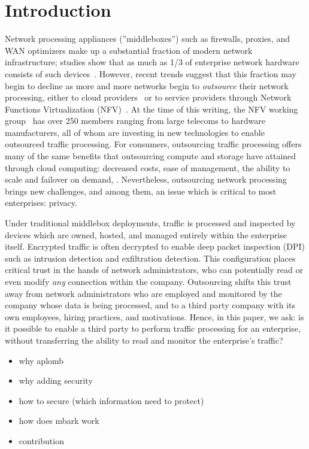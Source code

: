 
\section{Introduction}\label{sec:intro}

    Network processing appliances (''middleboxes'') such as firewalls, proxies, and WAN optimizers make up a substantial fraction of modern network infrastructure; studies show that as much as 1/3 of enterprise network hardware consists of such devices~\cite{aplomb}.
    However, recent trends suggest that this fraction may begin to decline as more and more networks begin to {\it outsource} their network processing, either to cloud providers~\cite{aplomb, aryaka, zscalar} or to service providers through Network Functions Virtualization (NFV)~\cite{nfv}.
    At the time of this writing, the NFV working group~\cite{nfvwg} has over 250 members ranging from large telecoms to hardware manufacturers, all of whom are investing in new technologies to enable outsourced traffic processing.
    For consumers, outsourcing traffic processing offers many of the same benefits that outsourcing compute and storage have attained through cloud computing: decreased costs, ease of management, the ability to scale and failover on demand, \etc{}.
    Nevertheless, outsourcing network processing brings new challenges, and among them, an issue which is critical to most enterprises: privacy.
    
    Under traditional middlebox deployments, traffic is processed and inspected by devices which are owned, hosted, and managed entirely within the enterprise itself.
    Encrypted traffic is often decrypted to enable deep packet inspection (DPI) such as intrusion detection and exfiltration detection.
    This configuration places critical trust in the hands of network administrators, who can potentially read or even modify {\it any} connection within the company.
    Outsourcing shifts this trust away from network administrators who are employed and monitored by the company whose data is being processed, and to a third party company with its own employees, hiring practices, and motivations.
    Hence, in this paper, we ask: is it possible to enable a third party to perform traffic processing for an enterprise, without transferring the ability to read and monitor the enterprise's traffic?
    
    
\begin{itemize}
\item why aplomb
\item why adding security
\item how to secure (which information need to protect)
\item how does mbark work
\item contribution
\end{itemize}
